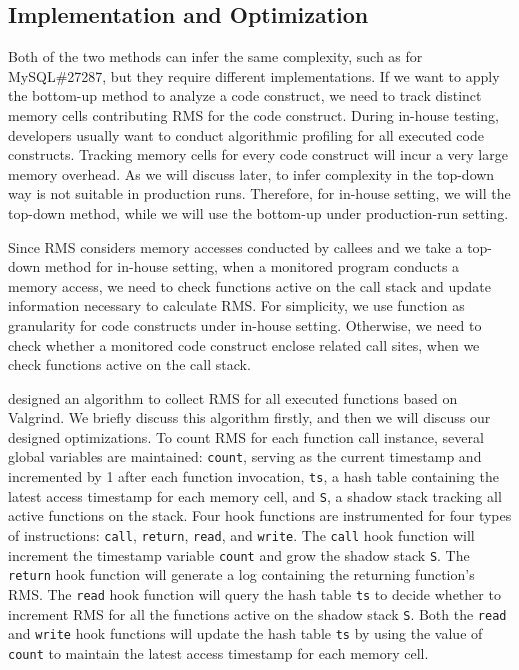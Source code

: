 \subsection{Implementation and Optimization}
Both of the two methods can infer the same complexity, such as for MySQL\#27287,
but they require different implementations.
If we want to apply the bottom-up method to analyze a code construct,
we need to track distinct memory cells contributing RMS for the code construct.
During in-house testing, developers usually want to conduct algorithmic profiling 
for all executed code constructs. 
Tracking memory cells for every code construct will 
incur a very large memory overhead.  
As we will discuss later, to infer complexity in the top-down way 
is not suitable in production runs. 
Therefore, for in-house setting, we will the top-down method, 
while we will use the bottom-up under production-run setting. 

Since RMS considers memory accesses conducted by callees 
and we take a top-down method for in-house setting,
when a monitored program conducts a memory access,
we need to check functions active on the call stack and 
update information necessary to calculate RMS. 
For simplicity, we use function as granularity for code constructs under in-house setting.
Otherwise, we need to check whether a monitored code construct enclose related call sites, 
when we check functions active on the call stack.  

\citet{Aprof1,Aprof2} designed an algorithm to collect 
RMS for all executed functions based on 
Valgrind. We briefly discuss this algorithm firstly, 
and then we will discuss our designed optimizations. 
To count RMS for each function call instance, 
several global variables are maintained: 
\texttt{count}, serving as the current timestamp and incremented 
by 1 after each function invocation,  
\texttt{ts}, a hash table containing the latest access timestamp for each memory cell, 
and \texttt{S}, a shadow stack tracking all active functions on the stack. 
Four hook functions are instrumented for four types of instructions:
\texttt{call}, \texttt{return}, \texttt{read}, and \texttt{write}.
The \texttt{call} hook function will increment the timestamp variable \texttt{count} 
and grow the shadow stack \texttt{S}.
The \texttt{return} hook function will generate a log containing the returning function's RMS.
The \texttt{read} hook function will query the hash table \texttt{ts} to decide whether 
to increment RMS for all the functions active on the shadow stack \texttt{S}.
Both the \texttt{read} and \texttt{write} hook functions will update the hash table \texttt{ts}
by using the value of \texttt{count} to maintain 
the latest access timestamp for each memory cell. 

